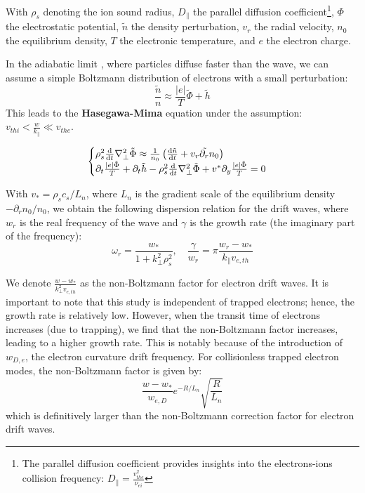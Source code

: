 \documentclass[11pt,openany]{report}
\begin{document}
\begin{multicols}{2}
    With $\rho_s$ denoting the ion sound radius, $D_\parallel$ the parallel diffusion coefficient\footnote{The parallel diffusion coefficient provides insights into the electrons-ions collision frequency: $D_\parallel = \frac{v_{the}^2}{\nu_{ei}}$}, $\Phi$ the electrostatic potential, $\tilde{n}$ the density perturbation, $v_r$ the radial velocity, $n_0$ the equilibrium density, $T$ the electronic temperature, and $e$ the electron charge.

    In the adiabatic limit \cite{Trapped_Particle_Mode}, where particles diffuse faster than the wave, we can assume a simple Boltzmann distribution of electrons with a small perturbation:
    $$\frac{\tilde{n}}{n} \approx \frac{\vert e \vert}{T} \tilde{\Phi} + \tilde{h}$$
    This leads to the \textbf{Hasegawa-Mima} \cite{Mima} equation under the assumption: $v_{thi} < \frac{w}{k_\parallel} \ll v_{the}$.

    \begin{equation}
        \begin{cases}
            \rho_s^2\dv{t}\nabla_\perp^2\tilde{\Phi} \approx \frac{1}{n_0}\left(\dv{\tilde{n}}{t} + \tilde{v_r\partial_r n_0}\right) \\
            \partial_t \frac{\vert e \vert \tilde{\Phi}}{T} + \partial_t \tilde{h} - \rho_s^2\dv{t}\nabla_\perp^2\tilde{\Phi}  + v^{*}\partial_y\frac{\vert e \vert \tilde{\Phi}}{T} = 0
        \end{cases}
    \end{equation}

    With $v_* = \rho_s c_s / L_n$, where $L_n$ is the gradient scale of the equilibrium density $-\partial_r n_0 / n_0$, we obtain the following dispersion relation for the drift waves, where $w_r$ is the real frequency of the wave and $\gamma$ is the growth rate (the imaginary part of the frequency):
    $$\omega_r = \frac{w_{*}}{1 + k_\perp^2 \rho_s^2}, \quad \frac{\gamma}{w_r} = \pi \frac{w_r - w_{*}}{k_\parallel v_{e,th}}$$

    We denote $\frac{w - w_*}{k_\perp^2 v_{e,th}}$ as the non-Boltzmann factor for electron drift waves. It is important to note that this study is independent of trapped electrons; hence, the growth rate is relatively low. However, when the transit time of electrons increases (due to trapping), we find \cite{San_diego} that the non-Boltzmann factor increases, leading to a higher growth rate. This is notably because of the introduction of $w_{D,e}$, the electron curvature drift frequency. For collisionless trapped electron modes, the non-Boltzmann factor is given by:
    $$\frac{w - w_*}{w_{e,D}} e^{-R/L_n} \sqrt{\frac{R}{L_n}}$$
    which is definitively larger than the non-Boltzmann correction factor for electron drift waves.


\end{multicols}
\end{document}
